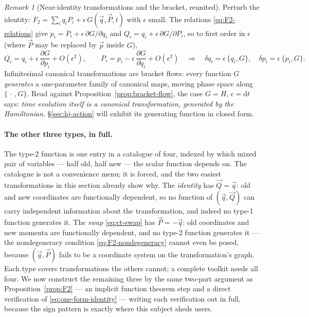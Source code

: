 \documentclass[11pt]{article}
\theoremstyle{plain}
\theoremstyle{definition}
\theoremstyle{remark}
\newtheorem{remark}[theorem]{Remark}
\newcommand{\dd}{\mathrm{d}}
\newcommand{\pd}[2]{\frac{\partial #1}{\partial #2}}
\newcommand{\vq}{\vec{q}}
\newcommand{\vp}{\vec{p}}
\newcommand{\vQ}{\vec{Q}}
\newcommand{\vP}{\vec{P}}
\begin{document}
\begin{remark}[Near-identity transformations and the bracket, reunited]
\label{rem:infinitesimal-ct}
Perturb the identity: $F_2 = \sum_i q_i P_i + \epsilon\,
G(\vq, \vP, t)$ with $\epsilon$ small. The relations
\eqref{eq:F2-relations} give
$p_i = P_i + \epsilon\,\partial G/\partial q_i$ and
$Q_i = q_i + \epsilon\,\partial G/\partial P_i$, so to first order in
$\epsilon$ (where $\vP$ may be replaced by $\vp$ inside $G$),
\begin{equation}
  Q_i = q_i + \epsilon\,\pd{G}{p_i} + O(\epsilon^2),
  \qquad
  P_i = p_i - \epsilon\,\pd{G}{q_i} + O(\epsilon^2)
  \quad\Longrightarrow\quad
  \delta q_i = \epsilon\,\{q_i, G\}, \quad
  \delta p_i = \epsilon\,\{p_i, G\} .
\end{equation}
Infinitesimal canonical transformations are bracket flows: every
function $G$ \emph{generates} a one-parameter family of canonical
maps, moving phase space along $\{\,\cdot\,, G\}$. Read against
Proposition~\ref{prop:bracket-flow}, the case $G = H$,
$\epsilon = \dd t$ says: \emph{time evolution itself is a canonical
transformation, generated by the Hamiltonian}. \S\ref{sec:hj-action}
will exhibit its generating function in closed form.
\end{remark}

\paragraph{The other three types, in full.}
The type-2 function is one entry in a catalogue of four, indexed by
which mixed pair of variables --- half old, half new --- the scalar
function depends on. The catalogue is not a convenience menu; it is
forced, and the two easiest transformations in this section already
show why. The \emph{identity} has $\vQ = \vq$: old and new coordinates
are functionally dependent, so no function of $(\vq, \vQ)$ can carry
independent information about the transformation, and indeed no
type-1 function generates it. The \emph{swap} \eqref{eq:ct-swap} has
$\vP = -\vq$: old coordinates and new momenta are functionally
dependent, and no type-2 function generates it --- the nondegeneracy
condition \eqref{eq:F2-nondegeneracy} cannot even be posed, because
$(\vq, \vP)$ fails to be a coordinate system on the transformation's
graph. Each type covers transformations the others cannot; a complete
toolkit needs all four. We now construct the remaining three by the
same two-part argument as Proposition~\ref{prop:F2} --- an implicit
function theorem step and a direct verification of
\eqref{eq:one-form-identity} --- writing each verification out in
full, because the sign pattern is exactly where this subject sheds
users.
\end{document}
